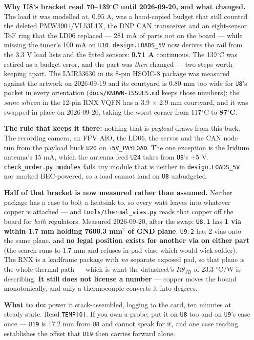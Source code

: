 \documentclass[11pt,a4paper]{article}
\newcommand{\file}[1]{\texttt{\small #1}}
\newcommand{\flag}[1]{\textcolor{warnred}{\textbf{#1}}}
\newcommand{\degC}{$^\circ$C}
\begin{document}
\textbf{Why U8's bracket read 70--139\degC{} until 2026-09-20, and what changed.} The load
it was modelled at, 0.95 A, was a hand-copied budget that still counted the deleted
PMW3901/VL53L1X, the DNP CAN transceiver and an eight-sensor ToF ring that the LD06
replaced --- 281 mA of parts not on the board --- while missing the tuner's 100 mA on
\file{U10}. \file{design.LOADS\_5V} now derives the rail from the 3.3 V load lists and the
fitted sensors: \textbf{0.71 A} continuous. The 139\degC{} was retired as a budget error,
and the part was \emph{then} changed --- two steps worth keeping apart. The LMR33630 in its
8-pin HSOIC-8 package was measured against the artwork on 2026-09-19 and its courtyard is
0.80 mm too wide for \file{U8}'s pocket in every orientation (\file{docs/KNOWN-ISSUES.md}
keeps those numbers); the \emph{same silicon} in the 12-pin RNX VQFN has a 3.9 $\times$
2.9 mm courtyard, and it was swapped in place on 2026-09-20, taking the worst corner from
117\degC{} to \textbf{87\degC}.

\flag{The rule that keeps it there:} nothing that is \emph{payload} draws from this
buck. The recording camera, an FPV AIO, the LD06, the servos and the CAN node run from the
payload buck \file{U20} on \file{+5V\_PAYLOAD}. The one exception is the Iridium antenna's
15 mA, which the antenna feed \file{U24} takes from \file{U8}'s +5 V. \file{check\_order.py modules} fails any module that is neither in
\file{design.LOADS\_5V} nor marked BEC-powered, so a load cannot land on \file{U8}
unbudgeted.

\textbf{Half of that bracket is now measured rather than assumed.} Neither package has a
case to bolt a heatsink to, so every watt leaves into whatever copper is attached --- and
\file{tools/thermal\_vias.py} reads that copper off the board for \emph{both} regulators.
Measured 2026-09-20, after the swap: \file{U8.1} has \textbf{1 via within 1.7 mm holding
7600.3 mm$^2$ of GND plane}, \file{U9.2} has 2 vias onto the same plane, and \textbf{no
legal position exists for another via on either part} (the search runs to 1.7 mm and refuses
in-pad vias, which would wick solder). The RNX is a leadframe package with \emph{no}
separate exposed pad, so that plane is the whole thermal path --- which is what the
datasheet's $R\theta_{JB}$ of 23.3 \degC{}/W is describing.
\flag{It still does not license a number} --- copper moves the bound monotonically, and only
a thermocouple converts it into degrees.

\textbf{What to do:} power it stack-assembled, logging to the card, ten minutes at steady
state. Read \file{TEMP[0]}. If you own a probe, put it on \file{U8} too and on \file{U9}'s
case once --- \file{U19} is 17.2 mm from \file{U8} and cannot speak for it, and one case
reading establishes the offset that \file{U19} then carries forward alone.
\end{document}
